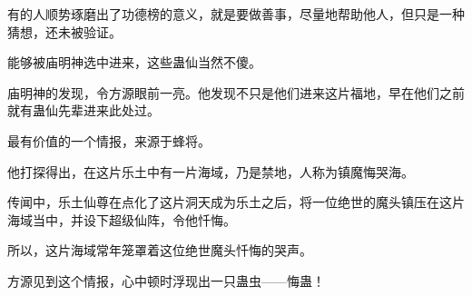\begin{this_body}
有的人顺势琢磨出了功德榜的意义，就是要做善事，尽量地帮助他人，但只是一种猜想，还未被验证。

能够被庙明神选中进来，这些蛊仙当然不傻。

庙明神的发现，令方源眼前一亮。他发现不只是他们进来这片福地，早在他们之前就有蛊仙先辈进来此处过。

最有价值的一个情报，来源于蜂将。

他打探得出，在这片乐土中有一片海域，乃是禁地，人称为镇魔悔哭海。

传闻中，乐土仙尊在点化了这片洞天成为乐土之后，将一位绝世的魔头镇压在这片海域当中，并设下超级仙阵，令他忏悔。

所以，这片海域常年笼罩着这位绝世魔头忏悔的哭声。

方源见到这个情报，心中顿时浮现出一只蛊虫——悔蛊！

\end{this_body}

